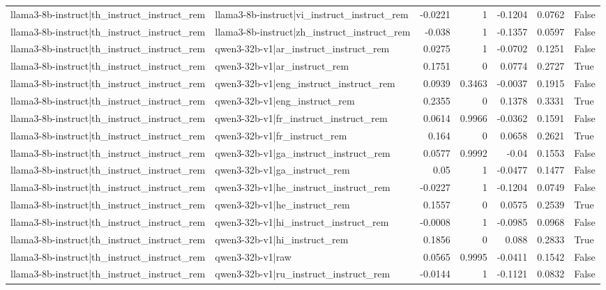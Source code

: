 \begin{table}
\begin{tabular}{l l r r r r l}
llama3-8b-instruct|th_instruct_instruct_rem & llama3-8b-instruct|vi_instruct_instruct_rem & -0.0221 & 1 & -0.1204 & 0.0762 & False \\
llama3-8b-instruct|th_instruct_instruct_rem & llama3-8b-instruct|zh_instruct_instruct_rem & -0.038 & 1 & -0.1357 & 0.0597 & False \\
llama3-8b-instruct|th_instruct_instruct_rem & qwen3-32b-v1|ar_instruct_instruct_rem & 0.0275 & 1 & -0.0702 & 0.1251 & False \\
llama3-8b-instruct|th_instruct_instruct_rem & qwen3-32b-v1|ar_instruct_rem & 0.1751 & 0 & 0.0774 & 0.2727 & True \\
llama3-8b-instruct|th_instruct_instruct_rem & qwen3-32b-v1|eng_instruct_instruct_rem & 0.0939 & 0.3463 & -0.0037 & 0.1915 & False \\
llama3-8b-instruct|th_instruct_instruct_rem & qwen3-32b-v1|eng_instruct_rem & 0.2355 & 0 & 0.1378 & 0.3331 & True \\
llama3-8b-instruct|th_instruct_instruct_rem & qwen3-32b-v1|fr_instruct_instruct_rem & 0.0614 & 0.9966 & -0.0362 & 0.1591 & False \\
llama3-8b-instruct|th_instruct_instruct_rem & qwen3-32b-v1|fr_instruct_rem & 0.164 & 0 & 0.0658 & 0.2621 & True \\
llama3-8b-instruct|th_instruct_instruct_rem & qwen3-32b-v1|ga_instruct_instruct_rem & 0.0577 & 0.9992 & -0.04 & 0.1553 & False \\
llama3-8b-instruct|th_instruct_instruct_rem & qwen3-32b-v1|ga_instruct_rem & 0.05 & 1 & -0.0477 & 0.1477 & False \\
llama3-8b-instruct|th_instruct_instruct_rem & qwen3-32b-v1|he_instruct_instruct_rem & -0.0227 & 1 & -0.1204 & 0.0749 & False \\
llama3-8b-instruct|th_instruct_instruct_rem & qwen3-32b-v1|he_instruct_rem & 0.1557 & 0 & 0.0575 & 0.2539 & True \\
llama3-8b-instruct|th_instruct_instruct_rem & qwen3-32b-v1|hi_instruct_instruct_rem & -0.0008 & 1 & -0.0985 & 0.0968 & False \\
llama3-8b-instruct|th_instruct_instruct_rem & qwen3-32b-v1|hi_instruct_rem & 0.1856 & 0 & 0.088 & 0.2833 & True \\
llama3-8b-instruct|th_instruct_instruct_rem & qwen3-32b-v1|raw & 0.0565 & 0.9995 & -0.0411 & 0.1542 & False \\
llama3-8b-instruct|th_instruct_instruct_rem & qwen3-32b-v1|ru_instruct_instruct_rem & -0.0144 & 1 & -0.1121 & 0.0832 & False \\

\end{tabular}
\end{table}
